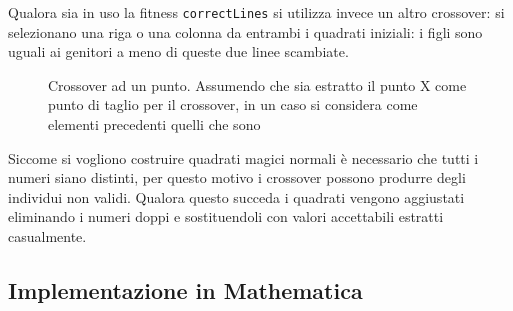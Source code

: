 \documentclass[italian,twoside,twocolumn]{article}
\begin{document}
Qualora sia in uso la fitness \texttt{correctLines} si utilizza invece un altro crossover: si selezionano una riga o una colonna da entrambi i quadrati iniziali: i figli sono uguali ai genitori a meno di queste due linee scambiate. 

\begin{figure}[!htbp]
	\centering
	\caption{Crossover ad un punto. Assumendo che sia estratto il punto X come punto di taglio per il crossover, in un caso si considera come elementi precedenti quelli che sono}
	\label{fig:crosso}
\end{figure}

\noindent
Siccome si vogliono costruire quadrati magici normali è necessario che tutti i numeri siano distinti, per questo motivo i crossover possono produrre degli individui non validi. Qualora questo succeda i quadrati vengono aggiustati eliminando i numeri doppi e sostituendoli con valori accettabili estratti casualmente.

\subsection{Implementazione in Mathematica}
\end{document}
